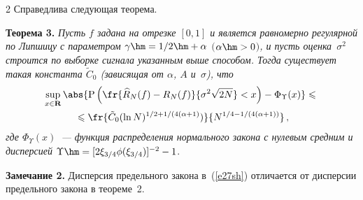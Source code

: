 \begin{multicols}{2}
Справедлива следующая теорема.

\medskip

\noindent
\textbf{Теорема 3.} \textit{Пусть $f$ задана на отрезке $[0,1]$ и 
является равномерно регулярной по Липшицу с параметром $\gamma\hm={1}/{2}\hm+\alpha$ 
$($$\alpha\hm>0$$)$, и пусть оценка~$\sigma^2$ строится по выборке сигнала указанным выше 
способом. Тогда существует такая константа $\tilde{C}_0$ (зависящая от $\alpha$, $A$ и~$\sigma$), 
что}
\begin{multline}
\sup\limits_{x\in\mathbf{R}}\abs{\mbox{P}\left(
\fr{\widehat{R}_N(f)-R_N(f)}{\sigma^2\sqrt{2N}}<x\right)-
\Phi_{\Upsilon}(x)}\leqslant{}\\
{}\leqslant
\fr{\tilde{C}_0(\ln N)^{{1}/{2}+{1}/(4(\alpha+1)})}{N^{1/4-1/(4(\alpha+1))}}\,,\label{e27sh}
\end{multline}
\textit{где $\Phi_{\Upsilon}(x)$~--- функция распределения нормального закона 
с нулевым средним и дисперсией} $\Upsilon\hm=[2\xi_{3/4}\phi(\xi_{3/4})]^{-2}-1$.

\medskip

\noindent
\textbf{Замечание 2.} Дисперсия предельного закона в~(\ref{e27sh}) 
отличается от дисперсии предельного закона в теореме~2.

\medskip


\end{multicols}
